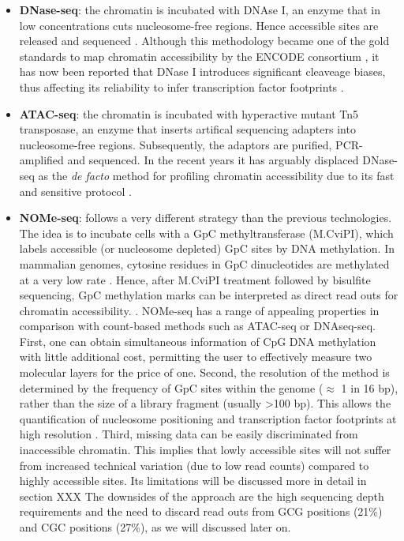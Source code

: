 \begin{itemize}

	\item \textbf{DNase-seq}: the chromatin is incubated with DNAse I, an enzyme that in low concentrations cuts nucleosome-free regions. Hence accessible sites are released and sequenced \cite{Song2010}. Although this methodology became one of the gold standards to map chromatin accessibility by the ENCODE consortium \cite{ENCODE2012,Thurman2012}, it has now been reported that DNase I introduces significant cleaveage biases, thus affecting its reliability to infer transcription factor footprints \cite{He2013}.

	\item \textbf{ATAC-seq}: the chromatin is incubated with hyperactive mutant Tn5 transposase, an enzyme that inserts artifical sequencing adapters into nucleosome-free regions. Subsequently, the adaptors are purified, PCR-amplified  and sequenced. In the recent years it has arguably displaced DNase-seq as the \textit{de facto} method for profiling chromatin accessibility due to its fast and sensitive protocol \cite{Buenrostro2015b,Tsompana2014,Nordstrom2019}.

	\item \textbf{NOMe-seq}: follows a very different strategy than the previous technologies. The idea is to incubate cells with a GpC methyltransferase (M.CviPI), which labels accessible (or nucleosome depleted) GpC sites by DNA methylation. In mammalian genomes, cytosine residues in GpC dinucleotides are methylated at a very low rate \cite{Kilgore2007}. Hence, after M.CviPI treatment followed by bisulfite sequencing, GpC methylation marks can be interpreted as direct read outs for chromatin accessibility. \cite{Kelly2012}. NOMe-seq has a range of appealing properties in comparison with count-based methods such as ATAC-seq or DNAseq-seq. First, one can obtain simultaneous information of CpG DNA methylation with little additional cost, permitting the user to effectively measure two molecular layers for the price of one. Second, the resolution of the method is determined by the frequency of GpC sites within the genome ($\approx$ 1 in 16 bp), rather than the size of a library fragment (usually >100 bp). This allows the quantification of nucleosome positioning and transcription factor footprints at high resolution \cite{Kelly2012,Pott2016,Nordstrom2019}. Third, missing data can be easily discriminated from inaccessible chromatin. This implies that lowly accessible sites will not suffer from increased technical variation (due to low read counts) compared to highly accessible sites. Its limitations will be discussed more in detail in section XXX
	The downsides of the approach are the high sequencing depth requirements and the need to discard read outs from GCG positions (21\%) and CGC positions (27\%), as we will discussed later on.	

\end{itemize}


